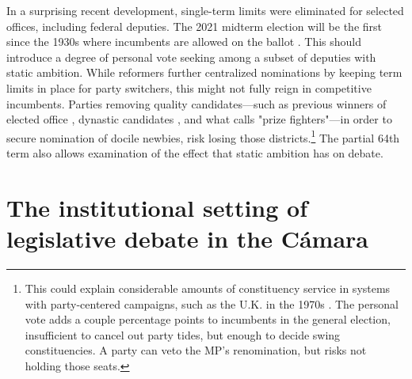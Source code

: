 \documentclass[letter,12pt]{article}
\begin{document}
In a surprising recent development, single-term limits were eliminated for selected offices, including federal deputies. The 2021 midterm election will be the first since the 1930s where incumbents are allowed on the ballot \citep[see][ for details]{magarInstReel.2017}. This should introduce a degree of personal vote seeking among a subset of deputies with static ambition. While reformers further centralized nominations by keeping term limits in place for party switchers, this might not fully reign in competitive incumbents. Parties removing quality candidates---such as previous winners of elected office \citep{jacobson.1997}, dynastic candidates \citep{enriquez-dinastias2018itam}, and what \citet{zallerprizeFighters} calls "prize fighters"---in order to secure nomination of docile newbies, risk losing those districts.\footnote{This could explain considerable amounts of constituency service in systems with party-centered campaigns, such as the U.K. in the 1970s \citep{cain.etal.1987}. The personal vote adds a couple percentage points to incumbents in the general election, insufficient to cancel out party tides, but enough to decide swing constituencies. A party can veto the MP's renomination, but risks not holding those seats.} The partial 64th term also allows examination of the effect that static ambition has on debate.


\section{The institutional setting of legislative debate in the Cámara} %

\end{document}
